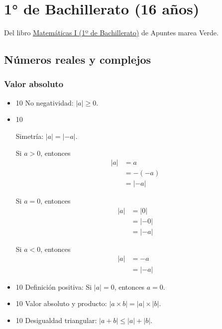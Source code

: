 \documentclass[11pt]{article}
\author{José A. Alonso}
\date{\today}
\title{}
\begin{document}
\tableofcontents


\section{1° de Bachillerato (16 años)}
\label{sec:org5ed31f5}

Del libro \href{http://www.apuntesmareaverde.org.es/grupos/mat/LOMLOE/Bachillerato/Matematicas\_I.pdf}{Matemáticas I (1º de Bachillerato)} de Apuntes marea Verde.

\subsection{Números reales y complejos}
\label{sec:org13d0810}

\subsubsection{Valor absoluto}
\label{sec:org6bb0a22}

\begin{itemize}
\item 10 No negatividad: \(|a| \geq 0\).

\item 10
\begin{teorema}
Simetría: \(|a| = |-a|\).
\end{teorema}
\begin{demostracion}
Si \(a > 0\), entonces
\begin{align*}
|a| &= a \\
    &= -(-a) \\
    &= |-a|
\end{align*}

Si \(a = 0\), entonces
\begin{align*}
    |a| &= |0| \\
        &= |-0| \\
        &= |-a|
\end{align*}

Si \(a < 0\), entonces
\begin{align*}
|a| &= -a \\
    &= |-a|
\end{align*}
\end{demostracion}

\item 10 Definición positiva: Si \(|a| = 0\), entonces \(a = 0\).

\item 10 Valor absoluto y producto: \(|a \times b| = |a| \times |b|\).

\item 10 Desigualdad triangular: \(|a + b| \leq |a| + |b|\).
\end{itemize}
\end{document}
